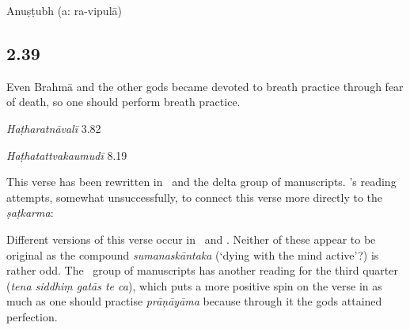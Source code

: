 \begin{ekdosis}
\begin{metre}[hp02_038]
Anuṣṭubh (a: ra-vipulā)
\end{metre}

\subsection*{2.39}
\begin{translation}[hp02_039]
Even Brahmā and the other gods became devoted to breath practice through fear of death, so one should perform breath practice.
\end{translation}


\begin{testimonia}[hp02_039]
\emph{Haṭharatnāvalī} 3.82

\begin{versinnote}
\end{versinnote}

\emph{Haṭhatattvakaumudī} 8.19

\begin{versinnote}
\end{versinnote}
\end{testimonia}

\begin{philcomm}[hp02_039]
This verse has been rewritten in \etaTwo\ and the delta group of manuscripts. \etaTwo's reading attempts, somewhat unsuccessfully, to connect this verse more directly to the \emph{ṣaṭkarma}:
\begin{versinnote}
\end{versinnote}
Different versions of this verse occur in \etaTwo\ and \epsilonThree. Neither of these appear to be original as the compound \emph{sumanaskāntaka} (`dying with the mind active'?) is rather odd. The \delta \ group of manuscripts has another reading for the third quarter (\emph{tena siddhiṃ gatās te ca}), which puts a more positive spin on the verse in as much as one should practise \emph{prāṇāyāma} because through it the gods attained perfection. 
\end{philcomm}


\end{ekdosis}
